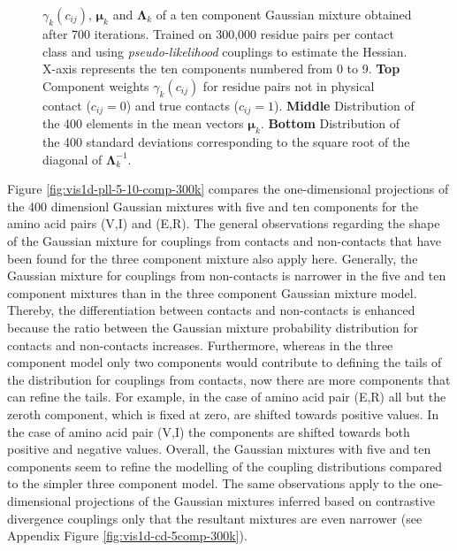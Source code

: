 \documentclass[11pt,a4paper,twoside]{book}
\newcommand{\eq}{\!=\!}
\newcommand{\Lk}{\mathbf{\Lambda}_k}
\newcommand{\muk}{\mathbf{\mu}_k}
\newcommand{\cij}{c_{ij}}
\theoremstyle{definition}
\theoremstyle{definition}
\theoremstyle{remark}
\begin{document}
\begin{figure}
{\(\gamma_k(\cij)\), \(\muk\) and \(\Lk\) of a ten component Gaussian
mixture obtained after 700 iterations. Trained on 300,000 residue pairs
per contact class and using \emph{pseudo-likelihood} couplings to
estimate the Hessian. X-axis represents the ten components numbered from
0 to 9. \textbf{Top} Component weights \(\gamma_k(\cij)\) for residue
pairs not in physical contact (\(\cij \eq 0\)) and true contacts
(\(\cij \eq 1\)). \textbf{Middle} Distribution of the 400 elements in
the mean vectors \(\muk\). \textbf{Bottom} Distribution of the 400
standard deviations corresponding to the square root of the diagonal of
\(\Lk^{-1}\).}\label{fig:stats-pll-10comp-300k}
\end{figure}

Figure \ref{fig:vis1d-pll-5-10-comp-300k} compares the one-dimensional
projections of the 400 dimensionl Gaussian mixtures with five and ten
components for the amino acid pairs (V,I) and (E,R). The general
observations regarding the shape of the Gaussian mixture for couplings
from contacts and non-contacts that have been found for the three
component mixture also apply here. Generally, the Gaussian mixture for
couplings from non-contacts is narrower in the five and ten component
mixtures than in the three component Gaussian mixture model. Thereby,
the differentiation between contacts and non-contacts is enhanced
because the ratio between the Gaussian mixture probability distribution
for contacts and non-contacts increases. Furthermore, whereas in the
three component model only two components would contribute to defining
the tails of the distribution for couplings from contacts, now there are
more components that can refine the tails. For example, in the case of
amino acid pair (E,R) all but the zeroth component, which is fixed at
zero, are shifted towards positive values. In the case of amino acid
pair (V,I) the components are shifted towards both positive and negative
values. Overall, the Gaussian mixtures with five and ten components seem
to refine the modelling of the coupling distributions compared to the
simpler three component model. The same observations apply to the
one-dimensional projections of the Gaussian mixtures inferred based on
contrastive divergence couplings only that the resultant mixtures are
even narrower (see Appendix Figure \ref{fig:vis1d-cd-5comp-300k}).
\end{document}

